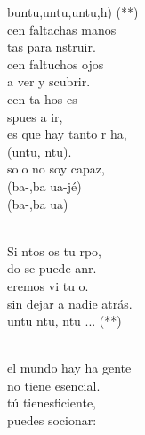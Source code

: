 \begin{cancion}%
	buntu,untu,untu,h) (**)\\
\jump
	cen faltachas manos \\
	tas para nstruir.\\
	cen faltuchos ojos \\
	a ver y scubrir.\\
	cen ta hos es \\
	spues a ir,\\
	es que hay tanto r ha,\\
	(untu, ntu).\\
	solo no soy capaz,\\
	(ba-,ba ua-jé)\\
	(ba-,ba ua)\\\jump\\
	\begin{chorus}%
	Si ntos os tu rpo,\\
	do se puede anr.\\
	eremos vi tu o. \\
sin dejar a nadie atrás.\\
	untu ntu, ntu ... (**)\\
	\end{chorus}%
	\jump\\
	 el mundo hay ha gente \\
	 no tiene  esencial.\\
	 tú tienesficiente, \\
	puedes socionar:\\

\end{cancion}
